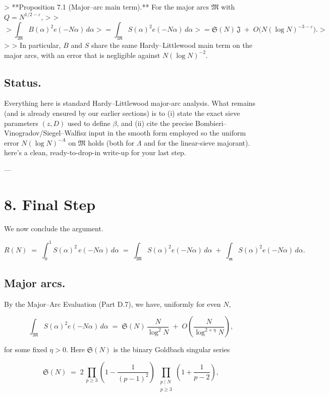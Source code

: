 \documentclass[11pt]{article}
\theoremstyle{definition}
\theoremstyle{remark}
\begin{document}
> **Proposition 7.1 (Major–arc main term).** For the major arcs $\mathfrak M$ with $Q=N^{1/2-\varepsilon}$,
>
> $$
> \int_{\mathfrak M} B(\alpha)^2 e(-N\alpha)\,d\alpha
> =\int_{\mathfrak M} S(\alpha)^2 e(-N\alpha)\,d\alpha
> =\mathfrak S(N)\,\mathfrak J\;+\;O\!\big(N(\log N)^{-3-\varepsilon}\big).
> $$
>
> In particular, $B$ and $S$ share the same Hardy–Littlewood main term on the major arcs, with an error that is negligible against $N(\log N)^{-2}$.

\subsection*{Status.} 
Everything here is standard Hardy–Littlewood major-arc analysis. What remains (and is already ensured by our earlier sections) is to (i) state the exact sieve parameters $(z,D)$ used to define $\beta$, and (ii) cite the precise Bombieri–Vinogradov/Siegel–Walfisz input in the smooth form employed so the uniform error $N(\log N)^{-A}$ on $\mathfrak M$ holds (both for $\Lambda$ and for the linear-sieve majorant).
here’s a clean, ready-to-drop-in write-up for your last step.

---

\section*{8. Final Step}

We now conclude the argument.

$$
R(N)\;=\;\int_0^1 S(\alpha)^2\,e(-N\alpha)\,d\alpha
\;=\;\int_{\mathfrak M} S(\alpha)^2 e(-N\alpha)\,d\alpha
\;+\;\int_{\mathfrak m} S(\alpha)^2 e(-N\alpha)\,d\alpha.
$$

\subsection*{Major arcs.}

By the Major–Arc Evaluation (Part D.7), we have, uniformly for even $N$,

$$
\int_{\mathfrak M} S(\alpha)^2 e(-N\alpha)\,d\alpha
\;=\;\mathfrak S(N)\,\frac{N}{\log^2 N}\;+\;O\!\left(\frac{N}{\log^{2+\eta}N}\right),
$$

for some fixed $\eta>0$. Here $\mathfrak S(N)$ is the binary Goldbach singular series

$$
\mathfrak S(N)
\;=\;2\,\prod_{p\ge 3}\!\left(1-\frac{1}{(p-1)^2}\right)
\;\prod_{\substack{p\mid N\\ p\ge 3}}\!\!\left(1+\frac{1}{p-2}\right),
$$
\end{document}
